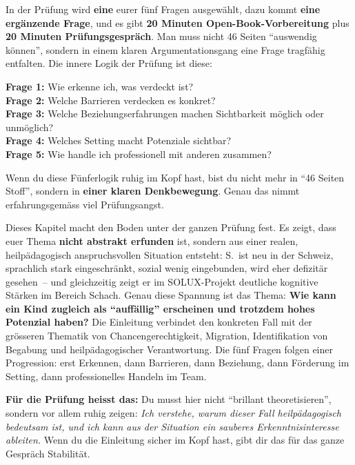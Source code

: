 \documentclass[ngerman, a4paper]{article}
\begin{document}
\begin{kapitelueberblick}
In der Prüfung wird \textbf{eine} eurer fünf Fragen ausgewählt, dazu kommt
\textbf{eine ergänzende Frage}, und es gibt \textbf{20 Minuten
Open-Book-Vorbereitung} plus \textbf{20 Minuten Prüfungsgespräch}. Man muss
nicht 46 Seiten \enquote{auswendig können}, sondern in einem klaren
Argumentationsgang eine Frage tragfähig entfalten. Die innere Logik der
Prüfung ist diese:

\medskip
\textbf{Frage 1:} Wie erkenne ich, was verdeckt ist?\\
\textbf{Frage 2:} Welche Barrieren verdecken es konkret?\\
\textbf{Frage 3:} Welche Beziehungserfahrungen machen Sichtbarkeit möglich oder unmöglich?\\
\textbf{Frage 4:} Welches Setting macht Potenziale sichtbar?\\
\textbf{Frage 5:} Wie handle ich professionell mit anderen zusammen?

\medskip Wenn du diese Fünferlogik ruhig im Kopf hast, bist du nicht mehr in
\enquote{46 Seiten Stoff}, sondern in \textbf{einer klaren Denkbewegung}.
Genau das nimmt erfahrungsgemäss viel Prüfungsangst.
\end{kapitelueberblick}

\begin{kapitelueberblick}
Dieses Kapitel macht den Boden unter der ganzen Prüfung fest. Es zeigt, dass euer Thema \textbf{nicht abstrakt erfunden} ist, sondern aus einer realen, heilpädagogisch anspruchsvollen Situation entsteht: S.\ ist neu in der Schweiz, sprachlich stark eingeschränkt, sozial wenig eingebunden, wird eher defizitär gesehen~-- und gleichzeitig zeigt er im SOLUX-Projekt deutliche kognitive Stärken im Bereich Schach. Genau diese Spannung ist das Thema: \textbf{Wie kann ein Kind zugleich als \enquote{auffällig} erscheinen und trotzdem hohes Potenzial haben?} Die Einleitung verbindet den konkreten Fall mit der grösseren Thematik von Chancengerechtigkeit, Migration, Identifikation von Begabung und heilpädagogischer Verantwortung. Die fünf Fragen folgen einer Progression: erst Erkennen, dann Barrieren, dann Beziehung, dann Förderung im Setting, dann professionelles Handeln im Team.

\medskip\textbf{Für die Prüfung heisst das:} Du musst hier nicht \enquote{brillant theoretisieren}, sondern vor allem ruhig zeigen: \textit{Ich verstehe, warum dieser Fall heilpädagogisch bedeutsam ist, und ich kann aus der Situation ein sauberes Erkenntnisinteresse ableiten.} Wenn du die Einleitung sicher im Kopf hast, gibt dir das für das ganze Gespräch Stabilität.
\end{kapitelueberblick}
\end{document}
